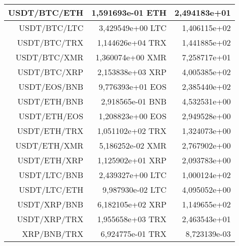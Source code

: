 \begin{table}
\begin{tabular}{|| r | r | r ||}
 \hline USDT/BTC/ETH & 1,591693e-01 ETH & 2,494183e+01\\ 
 \hline USDT/BTC/LTC & 3,429549e+00 LTC & 1,406115e+02\\ 
 \hline USDT/BTC/TRX & 1,144626e+04 TRX & 1,441885e+02\\ 
 \hline USDT/BTC/XMR & 1,360074e+00 XMR & 7,258717e+01\\ 
 \hline USDT/BTC/XRP & 2,153838e+03 XRP & 4,005385e+02\\ 
 \hline USDT/EOS/BNB & 9,776393e+01 EOS & 2,385440e+02\\ 
 \hline USDT/ETH/BNB & 2,918565e-01 BNB & 4,532531e+00\\ 
 \hline USDT/ETH/EOS & 1,208823e+00 EOS & 2,949528e+00\\ 
 \hline USDT/ETH/TRX & 1,051102e+02 TRX & 1,324073e+00\\ 
 \hline USDT/ETH/XMR & 5,186252e-02 XMR & 2,767902e+00\\ 
 \hline USDT/ETH/XRP & 1,125902e+01 XRP & 2,093783e+00\\ 
 \hline USDT/LTC/BNB & 2,439327e+00 LTC & 1,000124e+02\\ 
 \hline USDT/LTC/ETH & 9,987930e-02 LTC & 4,095052e+00\\ 
 \hline USDT/XRP/BNB & 6,182105e+02 XRP & 1,149655e+02\\ 
 \hline USDT/XRP/TRX & 1,955658e+03 TRX & 2,463543e+01\\ 
 \hline XRP/BNB/TRX & 6,924775e-01 TRX & 8,723139e-03\\ 
 \hline
\end{tabular}
\end{table}